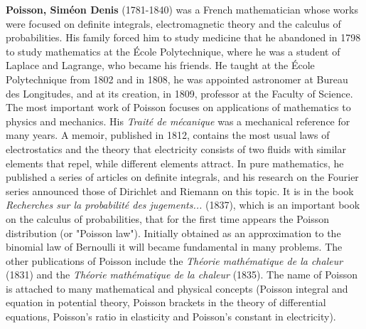 \textbf{Poisson, Siméon Denis} (1781-1840) was a French mathematician whose works were focused on definite integrals, electromagnetic theory and the calculus of probabilities. His family forced him to study medicine that he abandoned in 1798 to study mathematics at the École Polytechnique, where he was a student of Laplace and Lagrange, who became his friends. He taught at the École Polytechnique from 1802 and in 1808, he was appointed astronomer at Bureau des Longitudes, and at its creation, in 1809, professor at the Faculty of Science. The most important work of Poisson focuses on applications of mathematics to physics and mechanics. His \textit{Traité de mécanique} was a mechanical reference for many years. A memoir, published in 1812, contains the most usual laws of electrostatics and the theory that electricity consists of two fluids with similar elements that repel, while different elements attract. In pure mathematics, he published a series of articles on definite integrals, and his research on the Fourier series announced those of Dirichlet and Riemann on this topic. It is in the book \textit{Recherches sur la probabilité des jugements...} (1837), which is an important book on the calculus of probabilities, that for the first time appears the Poisson distribution (or "Poisson law"). Initially obtained as an approximation to the binomial law of Bernoulli it will became fundamental in many problems. The other publications of Poisson include the \textit{Théorie mathématique de la chaleur} (1831) and the\textit{ Théorie mathématique de la chaleur} (1835). The name of Poisson is attached to many mathematical and physical concepts (Poisson integral and equation in potential theory, Poisson brackets in the theory of differential equations, Poisson's ratio in elasticity and Poisson's constant in electricity).

